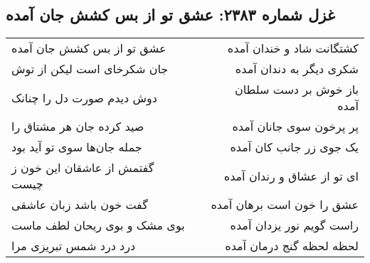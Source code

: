 \begin{center}
\section*{غزل شماره ۲۳۸۳: عشق تو از بس کشش جان آمده}
\label{sec:2383}
\begin{longtable}{l p{0.5cm} r}
عشق تو از بس کشش جان آمده
&&
کشتگانت شاد و خندان آمده
\\
جان شکرخای است لیکن از توش
&&
شکری دیگر به دندان آمده
\\
دوش دیدم صورت دل را چنانک
&&
باز خوش بر دست سلطان آمده
\\
صید کرده جان هر مشتاق را
&&
پر پرخون سوی جانان آمده
\\
جمله جان‌ها سوی تو آید بود
&&
یک جوی زر جانب کان آمده
\\
گفتمش از عاشقان این خون ز چیست
&&
ای تو از عشاق و رندان آمده
\\
گفت خون باشد زبان عاشقی
&&
عشق را خون است برهان آمده
\\
بوی مشک و بوی ریحان لطف ماست
&&
راست گویم نور یزدان آمده
\\
درد درد شمس تبریزی مرا
&&
لحظه لحظه گنج درمان آمده
\\
\end{longtable}
\end{center}
